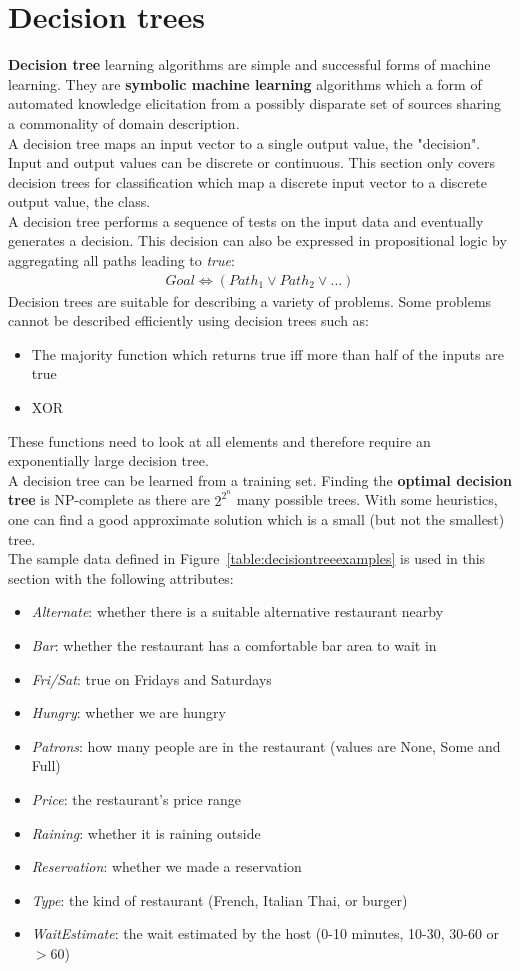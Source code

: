 \documentclass{report}
\begin{document}
\section{Decision trees}
{\bf Decision tree} learning algorithms are simple and successful forms of machine learning.
They are {\bf symbolic machine learning} algorithms which a form of automated knowledge elicitation from a possibly disparate set of sources sharing a commonality of domain description.
\\
A decision tree maps an input vector to a single output value, the "decision". Input and output values can be discrete or continuous. This section only covers decision trees for classification which map a discrete input vector to a discrete output value, the class. \\
A decision tree performs a sequence of tests on the input data and eventually generates a decision. This decision can also be expressed in propositional logic by aggregating all paths leading to {\em true}:
\begin{align*}
Goal \iff (Path_1 \vee Path_2 \vee ...)
\end{align*}
Decision trees are suitable for describing a variety of problems. Some problems cannot be described efficiently using decision trees such as:
\begin{itemize}
\item The majority function which returns true iff more than half of the inputs are true
\item XOR
\end{itemize}
These functions need to look at all elements and therefore require an exponentially large decision tree. \\
A decision tree can be learned from a training set. Finding the {\bf optimal decision tree} is NP-complete as there are $2^{2^n}$ many possible trees. With some heuristics, one can find a good approximate solution which is a small (but not the smallest) tree. \\
The sample data defined in Figure~\ref{table:decisiontreeexamples} is used in this section with the following attributes:
\begin{itemize}
\item {\em Alternate}: whether there is a suitable alternative restaurant nearby
\item {\em Bar}: whether the restaurant has a comfortable bar area to wait in
\item {\em Fri/Sat}: true on Fridays and Saturdays
\item {\em Hungry}: whether we are hungry
\item {\em Patrons}: how many people are in the restaurant (values are None, Some and Full)
\item {\em Price}: the restaurant's price range
\item {\em Raining}: whether it is raining outside
\item {\em Reservation}: whether we made a reservation
\item {\em Type}: the kind of restaurant (French, Italian Thai, or burger)
\item {\em WaitEstimate}: the wait estimated by the host (0-10 minutes, 10-30, 30-60 or $>$60)
\end{itemize}
\end{document}
